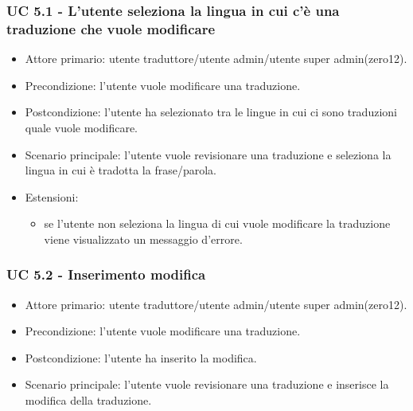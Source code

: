     \subsubsection{UC 5.1 - L'utente seleziona la lingua in cui c'è una traduzione che vuole modificare}
        \begin{itemize}
            \item Attore primario: utente traduttore/utente admin/utente super admin(zero12).
            \item Precondizione: l'utente vuole modificare una traduzione.
            \item Postcondizione: l'utente ha selezionato tra le lingue in cui ci sono traduzioni quale vuole modificare.
            \item Scenario principale: l'utente vuole revisionare una traduzione e seleziona la lingua in cui è tradotta la frase/parola.
            \item Estensioni:
                \begin{itemize}
                    \item se l'utente non seleziona la lingua di cui vuole modificare la traduzione viene visualizzato un messaggio d'errore.
                \end{itemize}
        \end{itemize}
    \subsubsection{UC 5.2 - Inserimento modifica}
        \begin{itemize}
            \item Attore primario: utente traduttore/utente admin/utente super admin(zero12).
            \item Precondizione: l'utente vuole modificare una traduzione.
            \item Postcondizione: l'utente ha inserito la modifica.
            \item Scenario principale: l'utente vuole revisionare una traduzione e inserisce la modifica della traduzione.
        \end{itemize}
